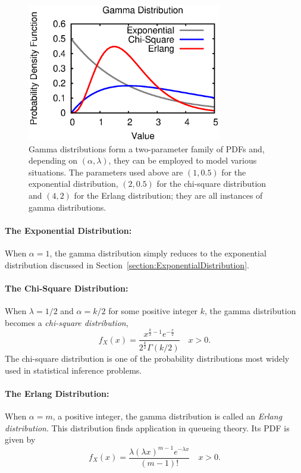 \begin{figure}[ht]
\begin{center}
\includegraphics[width=8.5cm]{Figures/8chapter/gamma_pdf}
\end{center}
\caption{Gamma distributions form a two-parameter family of PDFs and, depending on $(\alpha, \lambda)$, they can be employed to model various situations.
The parameters used above are $(1, 0.5)$ for the exponential distribution, $(2, 0.5)$ for the chi-square distribution and $(4, 2)$ for the Erlang distribution;
they are all instances of gamma distributions.}
\label{figure:GammaDistribution}
\end{figure}

\paragraph{The Exponential Distribution:}
When $\alpha = 1$, the gamma distribution simply reduces to the exponential distribution discussed in Section~\ref{section:ExponentialDistribution}.

\paragraph{The Chi-Square Distribution:}
When $\lambda = 1/2$ and $\alpha = k/2$ for some positive integer $k$, the gamma distribution becomes a \emph{chi-square distribution},
\begin{equation*}
f_X (x) = \frac{x^{\frac{k}{2} - 1} e^{-\frac{x}{2}}}{2^{\frac{k}{2}}\Gamma (k/2)} \quad  x > 0.
\end{equation*}
The chi-square distribution is one of the probability distributions most widely used in statistical inference problems.


\paragraph{The Erlang Distribution:}
When $\alpha = m$, a positive integer, the gamma distribution is called an \emph{Erlang distribution}.
This distribution finds application in queueing theory.
Its PDF is given by
\begin{equation*}
f_X (x) = \frac{\lambda (\lambda x)^{m - 1} e^{-\lambda x}}{(m-1)!} \quad  x > 0.
\end{equation*}

